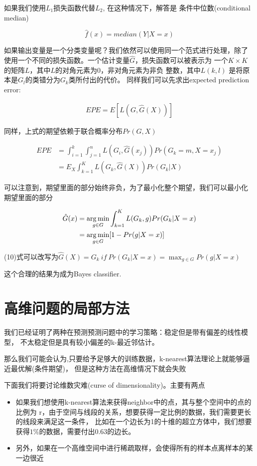 \documentclass[ruled]{article}
\begin{document}
如果我们使用$L_1$损失函数代替$L_2$, 在这种情况下，解答是
条件中位数(conditional median)

\begin{equation}
  \hat{f}(x) = median(Y|X=x) 
\end{equation}

如果输出变量是一个分类变量呢？我们依然可以使用同一个范式进行处理，除了
使用一个不同的损失函数。一个估计变量$\hat{G}$，损失函数可以被表示为
一个$K \times K$ 的矩阵$L$，其中$L$的对角元素为0，非对角元素为非负
整数，其中$L(k, l)$ 是将原本是$G_l$的类错分为$G_k$类所付出的代价。
同样我们可以先求出expected prediction error:

\begin{align}
  EPE = E[L(G, \hat{G}(X))]
\end{align}

同样，上式的期望依赖于联合概率分布$Pr(G, X)$

\begin{align}
  EPE &= \int_{i=1}^{k} \int_{j=1}^{n} L(G_i, \hat{G}(x_j)) 
  Pr(G_k = m, X = x_j) \\
  &= E_X \int_{k=1}^{K} L(G_k, \hat{G}(X)) Pr(G_k|X)
\end{align}

可以注意到，期望里面的部分始终非负，为了最小化整个期望，我们可以最小化
期望里面的部分

\begin{align}
  \hat{G}(x) &= \argmin_{g \in G} \int_{k = 1}^{K} L(G_k, g)
  Pr(G_k | X = x) \\ 
  &= \argmin_{g \in G} [1 - Pr(g|X=x)]
\end{align}

(10)式可以改写为$\hat{G}(X) = G_k \ if \ Pr(G_k|X=x) = \max_{g \in G}
Pr(g | X = x)$

这个合理的结果为成为Bayes classifier.

\section{高维问题的局部方法}
我们已经证明了两种在预测预测问题中的学习策略：稳定但是带有偏差的线性模型，
不太稳定但是具有较小偏差的k-最近邻估计。

那么我们可能会认为,只要给予足够大的训练数据，k-nearest算法理论上就能够逼近最优解(条件期望)，
但是这种方法在高维情况下就会失败

下面我们将要讨论维数灾难(curse of dimensionality)。主要有两点
\begin{itemize}
  \item 如果我们想使用k-nearest算法来获得neighbor中的点，其与整个空间中的点的比例为
  r，由于空间与线段的关系，想要获得一定比例的数据，我们需要更长的线段来满足这一条件，
  比如在一个边长为1的十维的超立方体中，我们想要获得$1\%$的数据，需要付出0.63的边长。 
  \item 另外，如果在一个高维空间中进行稀疏取样，会使得所有的样本点离样本的某一边很近
\end{itemize}
\end{document}
